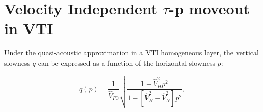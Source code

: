\begin{comment}
The high accuracy, the ability for unwrapping wavefront cusps
\citep{baan:1076}, and the linearity of traveltime modeling and
inversion enforce that \taup domain is the natural domain to handle
seismic anisotropy in a layered or vertically varying medium.
\end{comment}

\section{Velocity Independent $\tau $-p moveout in VTI}

Under the quasi-acoustic approximation 
\citep{alkhalifah:623,alkhalifah:1239} 
in a VTI homogeneous layer, the
vertical slowness $q$ can be expressed as a function of the horizontal slowness $p$: 

\begin{equation}
q(p)=\frac{1}{\hat{V}_{P0}}\sqrt{\dfrac{1-\hat{V}_{H}^{2}p^{2}}{1-[\hat{V}_{H}^{2}-\hat{V}_{N}^{2}]p^{2}}},
\label{eq:qALKHA}
\end{equation}  

